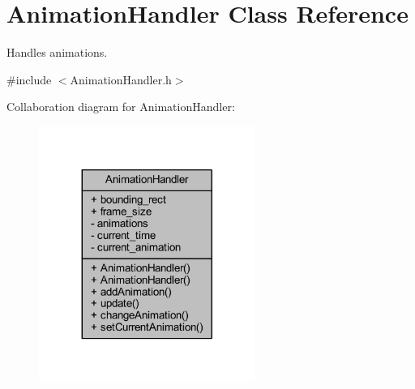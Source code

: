 \hypertarget{class_animation_handler}{\section{Animation\+Handler Class Reference}
\label{class_animation_handler}
}


Handles animations.  




{\ttfamily \#include $<$Animation\+Handler.\+h$>$}



Collaboration diagram for Animation\+Handler\+:\nopagebreak
\begin{figure}[H]
\begin{center}
\leavevmode
\includegraphics[width=200pt]{class_animation_handler__coll__graph}
\end{center}
\end{figure}

